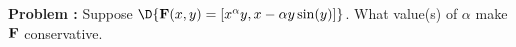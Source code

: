 {\bf Problem :} Suppose $\D{{\bf F}(x,y)= [x^{\alpha}y, x-\alpha y\sin(y)]}$.  What value(s) of $\alpha$ make ${\bf F}$ conservative. 